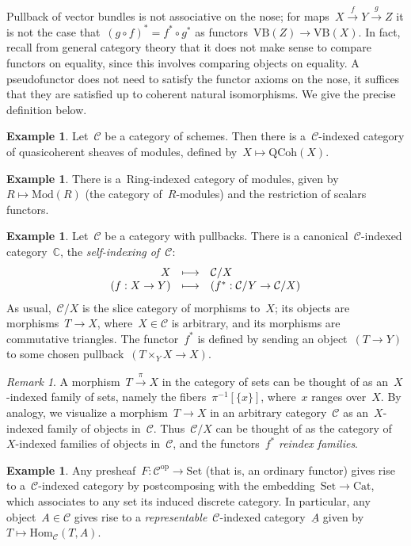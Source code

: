 \documentclass[a4paper,english,12pt]{scrartcl}
\theoremstyle{definition}
\newtheorem{ex}[defn]{Example}
\theoremstyle{plain}
\theoremstyle{remark}
\newtheorem{rem}[defn]{Remark}
\newcommand{\CC}{\mathbb{C}}
\newcommand{\C}{\mathcal{C}}
\newcommand{\op}{\mathrm{op}}
\newcommand{\xra}[1]{\xrightarrow{#1}}
\newcommand{\Mod}{\mathrm{Mod}}
\newcommand{\Set}{\mathrm{Set}}
\newcommand{\Cat}{\mathrm{Cat}}
\newcommand{\VB}{\mathrm{VB}}
\newcommand{\QCoh}{\mathrm{QCoh}}
\newcommand{\Hom}{\mathrm{Hom}}
\newcommand{\ul}[1]{\underline{#1}}
\begin{document}
Pullback of vector bundles is not associative on the nose; for maps~$X \xra{f}
Y \xra{g} Z$ it is not the case that~$(g \circ f)^* = f^* \circ g^*$ as
functors~$\VB(Z) \to \VB(X)$. In fact, recall from general category theory that
it does not make sense to compare functors on equality, since this involves
comparing objects on equality. A pseudofunctor does not need to satisfy the
functor axioms on the nose, it suffices that they are satisfied up to coherent
natural isomorphisms. We give the precise definition below.

\begin{ex}Let~$\C$ be a category of schemes. Then there is a~$\C$-indexed
category of quasicoherent sheaves of modules, defined by~$X \mapsto \QCoh(X)$.
\end{ex}

\begin{ex}There is a~$\mathrm{Ring}$-indexed category of modules, given by~$R
\mapsto \Mod(R)$ (the category of~$R$-modules) and the restriction of scalars
functors.
\end{ex}

\begin{ex}\label{ex:self-indexing}Let~$\C$ be a category with pullbacks. There
is a canonical~$\C$-indexed category~$\CC$, the \emph{self-indexing of~$\C$}:
\[ \begin{array}{@{}rcl@{}}
  X &\longmapsto& \C/X \\
  (f : X \to Y) &\longmapsto&
    (f^* : \C/Y \to \C/X)
\end{array} \]
As usual,~$\C/X$ is the slice category of morphisms to~$X$; its objects are
morphisms~$T \to X$, where~$X \in \C$ is arbitrary, and its morphisms are
commutative triangles. The functor~$f^*$ is defined by sending an object~$(T
\to Y)$ to some chosen pullback~$(T \times_Y X \to X)$.\end{ex}

\begin{rem}A morphism~$T \xra{\pi} X$ in the category of sets can be thought of as
an~$X$-indexed family of sets, namely the fibers~$\pi^{-1}[\{x\}]$, where~$x$
ranges over~$X$. By analogy, we visualize a morphism~$T \to X$ in an arbitrary
category~$\C$ as an~$X$-indexed family of objects in~$\C$. Thus~$\C/X$ can be
thought of as the category of~$X$-indexed families of objects in~$\C$, and the
functors~$f^*$ \emph{reindex families}.
\end{rem}

\begin{ex}\label{ex:presheaf}Any presheaf~$F : \C^\op \to \Set$ (that is, an ordinary functor)
gives rise to a~$\C$-indexed category by postcomposing with the embedding~$\Set
\to \Cat$, which associates to any set its induced discrete category. In
particular, any object~$A \in \C$ gives rise to a \emph{representable}~$\C$-indexed
category~$\ul{A}$ given by~$T \mapsto \Hom_\C(T,A)$.
\end{ex}
\end{document}
